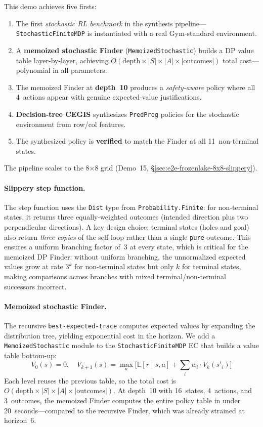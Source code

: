 This demo achieves five firsts:
\begin{enumerate}
  \item The first \emph{stochastic RL benchmark} in the synthesis pipeline---\texttt{StochasticFiniteMDP} is instantiated with a real Gym-standard environment.
  \item A \textbf{memoized stochastic Finder} (\texttt{MemoizedStochastic}) builds a DP value table layer-by-layer, achieving $O(\text{depth} \times |S| \times |A| \times |\text{outcomes}|)$ total cost---polynomial in all parameters.
  \item The memoized Finder at \textbf{depth~10} produces a \emph{safety-aware} policy where all 4~actions appear with genuine expected-value justifications.
  \item \textbf{Decision-tree CEGIS} synthesizes \texttt{PredProg} policies for the stochastic environment from row/col features.
  \item The synthesized policy is \textbf{verified} to match the Finder at all 11~non-terminal states.
\end{enumerate}
The pipeline scales to the 8×8 grid (Demo~15, \S\ref{sec:e2e-frozenlake-8x8-slippery}).

\paragraph{Slippery step function.}
The step function uses the \texttt{Dist} type from \texttt{Probability.Finite}: for non-terminal states, it returns three equally-weighted outcomes (intended direction plus two perpendicular directions).
A key design choice: terminal states (holes and goal) also return \emph{three copies} of the self-loop rather than a single \texttt{pure} outcome.
This ensures a uniform branching factor of~3 at every state, which is critical for the memoized DP Finder: without uniform branching, the unnormalized expected values grow at rate $3^k$ for non-terminal states but only $k$ for terminal states, making comparisons across branches with mixed terminal/non-terminal successors incorrect.

\paragraph{Memoized stochastic Finder.}
The recursive \texttt{best-expected-trace} computes expected values by expanding the distribution tree, yielding exponential cost in the horizon.
We add a \texttt{MemoizedStochastic} module to the \texttt{StochasticFiniteMDP} EC that builds a value table bottom-up:
\[
  V_0(s) = 0, \quad V_{k+1}(s) = \max_a \bigl[\mathbb{E}[r \mid s,a] + \textstyle\sum_i w_i \cdot V_k(s'_i)\bigr]
\]
Each level reuses the previous table, so the total cost is $O(\text{depth} \times |S| \times |A| \times |\text{outcomes}|)$.
At depth~10 with 16~states, 4~actions, and 3~outcomes, the memoized Finder computes the entire policy table in under 20~seconds---compared to the recursive Finder, which was already strained at horizon~6.

